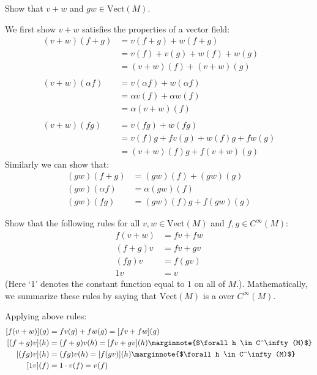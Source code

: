 \documentclass[10pt]{article}
\begin{document}
\begin{example}
	Show that $v+w$ and $gw \in \text{Vect}(M)$.
\end{example}
\sol We first show $v+w$ satisfies the properties of a vector field:
	$$
	\begin{aligned}
		(v+w)(f+g)&=v(f+g)+w(f+g)\\
		&=v(f)+v(g)+w(f)+w(g)\\
		&=(v+w)(f)+(v+w)(g)\\\\
		(v+w)(\alpha f)&=v(\alpha f)+w(\alpha f)\\
		&=\alpha v(f)+\alpha w(f)\\
		&=\alpha (v+w)(f)\\\\
		(v+w)(fg)&=v(fg)+w(fg)\\
		&=v(f)g+fv(g)+w(f)g+fw(g)\\
		&=(v+w)(f)g+f(v+w)(g)
	\end{aligned}
	$$
	Similarly we can show that:
	$$
	\begin{aligned}
		(gw)(f+g)&=(gw)(f)+(gw)(g)\\
		(gw)(\alpha f)&=\alpha (gw)(f)\\
		(gw)(fg)&=(gw)(f)g+f(gw)(g)
	\end{aligned}
	$$

\begin{example}\label{b1e8}
	Show that the following rules for all $v,w \in \text{Vect}(M)$ and
	$f, g \in C^\infty(M)$:
	$$
	\begin{aligned}
		f(v+w) &= fv + fw\\
		(f+g)v &= fv+gv\\
		(fg)v &= f(gv)\\
		1v &= v
	\end{aligned}
	$$
	(Here `$1$' denotes the constant function equal to $1$ on all of $M$.). 
	Mathematically, we summarize these rules by saying that $\text{Vect}(M)$ is 
	a  over $C^\infty(M)$.
\end{example}
\sol Applying above rules:
$$
\begin{aligned}
	[f(v+w)](g) &= fv(g) + fw(g) = [fv + fw](g)\\
	[(f+g)v](h) &= (f+g)v(h)=[fv+gv](h)\marginnote{$\forall h \in C^\infty(M)$}\\
	[(fg)v](h) &= (fg)v(h)=[f(gv)](h)\marginnote{$\forall h \in C^\infty(M)$}\\
	[1v](f) &= 1\cdot v(f)=v(f)
\end{aligned}
$$
\end{document}
